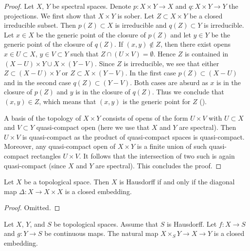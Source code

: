 \begin{proof}
  \leanok
  Let $X$, $Y$ be spectral spaces. Denote $p : X \times Y \to X$ and $q : X \times Y \to Y$ the projections. We first show that \(X \times Y\) is sober. Let $Z \subset X \times Y$ be a closed irreducible subset. Then $p(Z) \subset X$ is irreducible and $q(Z) \subset Y$ is irreducible. Let $x \in X$ be the generic point of the closure of $p(Z)$ and let $y \in Y$ be the generic point of the closure of $q(Z)$. If $(x, y) \notin Z$, then there exist opens $x \in U \subset X$, $y \in V \subset Y$ such that $Z \cap (U \times V) = \emptyset$. Hence $Z$ is contained in $(X - U) \times Y \cup X \times (Y - V)$. Since $Z$ is irreducible, we see that either $Z \subset (X - U) \times Y$ or $Z \subset X \times (Y - V)$. In the first case $p(Z) \subset (X - U)$ and in the second case $q(Z) \subset (Y - V)$. Both cases are absurd as $x$ is in the closure of $p(Z)$ and $y$ is in the closure of $q(Z)$. Thus we conclude that $(x, y) \in Z$, which means that $(x, y)$ is the generic point for $Z$ ().

  A basis of the topology of $X \times Y$ consists of opens of the form $U \times V$ with $U \subset X$ and $V \subset Y$ quasi-compact open (here we use that $X$ and $Y$ are spectral). Then $U \times V$ is quasi-compact as the product of quasi-compact spaces is quasi-compact. Moreover, any quasi-compact open of $X \times Y$ is a finite union of such quasi-compact rectangles $U \times V$. It follows that the intersection of two such is again quasi-compact (since $X$ and $Y$ are spectral). This concludes the proof.
\end{proof}

\begin{lemma}[{\stacksproject{08ZE}}]
  \label{thm:Hausdorff-diagonal-closed}
  \leanok
  Let \(X\) be a topological space. Then \(X\) is Hausdorff if and only if the diagonal map \(\Delta : X \to X \times X\) is a closed embedding.
\end{lemma}

\begin{proof}
  \leanok
  Omitted.
\end{proof}

\begin{lemma}[{\stacksproject{08ZH}}]
  \label{thm:pullback-closed-embedding-prod}
  \leanok
  Let \(X\), \(Y\), and \(S\) be topological spaces. Assume that \(S\) is Hausdorff. 
  Let \(f : X \to S\) and \(g : Y \to S\) be continuous maps. The natural map 
  \(X \times_S Y \to X \to Y\) is a closed embedding.
\end{lemma}

